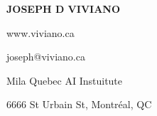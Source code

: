 \documentclass[a4paper,11pt,oneside]{book}
\begin{document}
\thispagestyle{empty} %

\noindent
\begin{minipage}{\textwidth}

    \vspace{0.1in}
    \begin{multicols}{2}

        \vspace*{\fill}
        \huge\textbf{JOSEPH D VIVIANO}
        \vspace*{\fill}

        \columnbreak\normalsize
        \hfill www.viviano.ca\

        \hfill joseph@viviano.ca\

        \hfill Mila Quebec AI Instuitute\

        \hfill 6666 St Urbain St, Montr\'eal, QC\

    \end{multicols}
    \vspace{0in}
\end{minipage}
\end{document}
